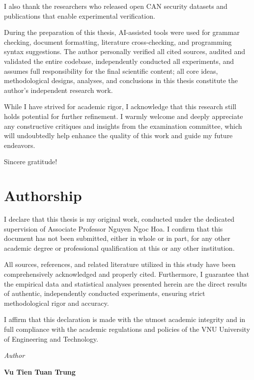 \documentclass[12pt, a4paper, reqno, oneside]{book}
\newcommand\chap[1]{%
  \clearpage\phantomsection%
  \chapter*{#1}%
  \addcontentsline{toc}{chapter}{#1}%
  \markboth{#1}{}%
}
\begin{document}
I also thank the researchers who released open CAN security datasets and publications that enable experimental verification.

During the preparation of this thesis, AI-assisted tools were used for grammar checking, document formatting, literature cross-checking, and programming syntax suggestions. The author personally verified all cited sources, audited and validated the entire codebase, independently conducted all experiments, and assumes full responsibility for the final scientific content; all core ideas, methodological designs, analyses, and conclusions in this thesis constitute the author's independent research work.

While I have strived for academic rigor, I acknowledge that this research still holds potential for further refinement. I warmly welcome and deeply appreciate any constructive critiques and insights from the examination committee, which will undoubtedly help enhance the quality of this work and guide my future endeavors.

Sincere gratitude!

\newpage

\chap{Authorship}
\vspace{20pt}
I declare that this thesis is my original work, conducted under the dedicated supervision of Associate Professor Nguyen Ngoc Hoa. I confirm that this document has not been submitted, either in whole or in part, for any other academic degree or professional qualification at this or any other institution.

All sources, references, and related literature utilized in this study have been comprehensively acknowledged and properly cited. Furthermore, I guarantee that the empirical data and statistical analyses presented herein are the direct results of authentic, independently conducted experiments, ensuring strict methodological rigor and accuracy.

I affirm that this declaration is made with the utmost academic integrity and in full compliance with the academic regulations and policies of the VNU University of Engineering and Technology.

\begin{flushright}
{\it Author}
\hskip 1.5cm\quad

\vskip 2cm
{\bf Vu Tien Tuan Trung}  \quad\ \quad
\end{flushright}
\end{document}
